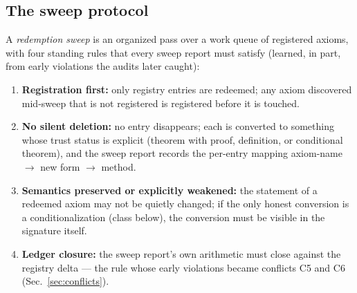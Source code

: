 
\subsection{The sweep protocol}
\label{sec:sweep-protocol}
A \emph{redemption sweep} is an organized pass over a work queue of
registered axioms, with four standing rules that every sweep report
must satisfy (learned, in part, from early violations the audits
later caught):

\begin{enumerate}
\item \textbf{Registration first:} only registry entries are
redeemed; any axiom discovered mid-sweep that is not registered is
registered before it is touched.
\item \textbf{No silent deletion:} no entry disappears; each is
converted to something whose trust status is explicit (theorem with
proof, definition, or conditional theorem), and the sweep report
records the per-entry mapping axiom-name $\to$ new form $\to$
method.
\item \textbf{Semantics preserved or explicitly weakened:} the
statement of a redeemed axiom may not be quietly changed; if the
only honest conversion is a conditionalization (class 
below), the conversion must be visible in the signature itself.
\item \textbf{Ledger closure:} the sweep report's own arithmetic
must close against the registry delta --- the rule whose early
violations became conflicts C5 and C6
(Sec.~\ref{sec:conflicts}).
\end{enumerate}

